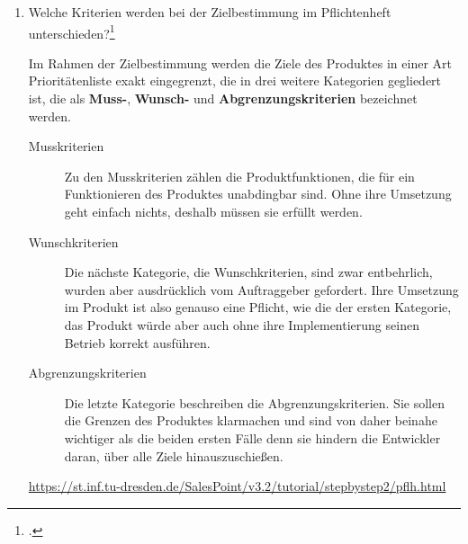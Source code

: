 \documentclass{bschlangaul-aufgabe}
\begin{document}

\begin{enumerate}


\item Welche Kriterien werden bei der Zielbestimmung im
Pflichtenheft unterschieden?\footcite{examen:66116:2016:09}

\begin{liAntwort}
Im Rahmen der Zielbestimmung werden die Ziele des Produktes in einer Art
Prioritätenliste exakt eingegrenzt, die in drei weitere Kategorien
gegliedert ist, die als \textbf{Muss-}, \textbf{Wunsch-} und
\textbf{Abgrenzungskriterien} bezeichnet werden.

\begin{description}
\item[Musskriterien] Zu den Musskriterien zählen die Produktfunktionen,
die für ein Funktionieren des Produktes unabdingbar sind. Ohne ihre
Umsetzung geht einfach nichts, deshalb müssen sie erfüllt werden.

\item[Wunschkriterien] Die nächste Kategorie, die Wunschkriterien, sind
zwar entbehrlich, wurden aber ausdrücklich vom Auftraggeber gefordert.
Ihre Umsetzung im Produkt ist also genauso eine Pflicht, wie die der
ersten Kategorie, das Produkt würde aber auch ohne ihre Implementierung
seinen Betrieb korrekt ausführen.

\item[Abgrenzungskriterien] Die letzte Kategorie  beschreiben die
Abgrenzungskriterien. Sie sollen die Grenzen des Produktes klarmachen
und sind von daher beinahe wichtiger als die beiden ersten Fälle denn
sie hindern die Entwickler daran, über alle Ziele hinauszuschießen.
\end{description}

\url{https://st.inf.tu-dresden.de/SalesPoint/v3.2/tutorial/stepbystep2/pflh.html}
\end{liAntwort}


\end{enumerate}
\end{document}
